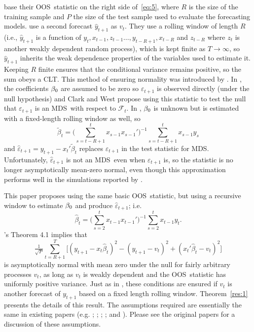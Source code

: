 \documentclass[12pt,fleqn]{article}
\newcommand\citepos[2][]{\citeauthor{#2}'s \citeyearpar[#1]{#2}}
\theoremstyle{definition}
\newcommand{\btrue}[1][]{\if#1*\hat\beta_{T+1}\else\beta_0\fi}
\newcommand{\osum}[1]{\sum_{#1=R+1}^T}
\newcommand{\oclt}[1]{\tfrac{1}{\sqrt{P}} \osum{#1}}
\newcommand{\clt}{CLT}
\newcommand{\mds}{MDS}
\newcommand{\oos}{OOS}
\begin{document}
\citet{ClW:06,ClW:07} base their \oos\ statistic on the right side
of~\eqref{eq:5}, where $R$ is the size of the training sample and $P$
the size of the test sample used to evaluate the forecasting models.
\citet{ClW:06} use a second forecast $\hat{y}_{t+1}$ as $v_t$.  They
use a rolling window of length $R$ (i.e., $\hat{y}_{t+1}$ is a
function of $y_t, x_{t-1}, z_{t-1} \dots, y_{t-R+1}, x_{t-R}$ and
$z_{t-R}$ where $z_t$ is another weakly dependent random process),
which is kept finite as $T \to \infty$, so $\hat{y}_{t+1}$ inherits
the weak dependence properties of the variables used to estimate it.
Keeping $R$ finite ensures that the conditional variance remains
positive, so the sum obeys a \clt.  This method of ensuring normality
was introduced by \citet{GiW:06}.  In \citet{ClW:06}, the coefficients $\btrue$ are
assumed to be zero so $\varepsilon_{t+1}$ is observed directly (under
the null hypothesis) and Clark and West propose using this statistic
to test the null that $\varepsilon_{t+1}$ is an \mds\ with respect to
$\mathcal{F}_t$.  In \citet{ClW:07}, $\btrue$ is unknown but is
estimated with a fixed-length rolling window as well, so
\begin{equation*}
  \tilde{\beta}_t = \Big(\sum_{s=t-R+1}^t x_{s-1} x_{s-1}'\Big)^{-1}
  \sum_{s=t-R+1}^t x_{s-1} y_s
\end{equation*}
and $\hat{\varepsilon}_{t+1} = y_{t+1} - x_t'\tilde{\beta}_t$ replaces
$\varepsilon_{t+1}$ in the test statistic for \mds.  Unfortunately,
$\hat{\varepsilon}_{t+1}$ is not an \mds\ even when
$\varepsilon_{t+1}$ is, so the statistic is no longer asymptotically
mean-zero normal, even though this approximation performs well in the
simulations reported by \citet{ClW:07}.

This paper proposes using the same basic \oos\ statistic, 
but using a recursive window to estimate $\btrue$ and produce
$\hat{\varepsilon}_{t+1}$; i.e.
\begin{equation}
  \label{eq:8}
  \hat{\beta}_t = \Big(\sum_{s=2}^{t} x_{t-1} x_{t-1}'\Big)^{-1}
  \sum_{s=2}^t x_{t-1} y_t.
\end{equation}
\citepos{Wes:96} Theorem 4.1 implies that
\begin{equation*}
  \oclt{t} \Big[(y_{t+1} -
  x_t\hat{\beta}_t)^2 - (y_{t+1} - v_t)^2 + (x_t'\hat{\beta}_t - v_t)^2 \Big]
\end{equation*}
is asymptotically normal with mean zero under the null for fairly
arbitrary processes $v_t$, as long as $v_t$ is weakly dependent and
the \oos\ statistic has uniformly positive variance.  Just as in
\citet{ClW:06}, these conditions are ensured if $v_t$ is another
forecast of $y_{t+1}$ based on a fixed length rolling window.
Theorem~\ref{res:1} presents the details of this result.  The
assumptions required are essentially the same in existing papers
(e.g. \citealp{Wes:96}; \citealp{WeM:98}; \citealp{Mcc:00};
\citealp{GiW:06}; and \citealp{ClW:06,ClW:07}).  Please see the
original papers for a discussion of these assumptions.
\end{document}

